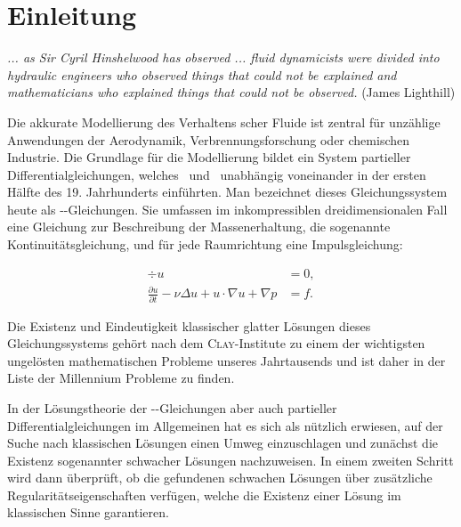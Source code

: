 \chapter*{Einleitung}

\begin{addmargin}[2em]{2em}%
  \textit{... as Sir Cyril Hinshelwood has observed ... fluid dynamicists
were divided into hydraulic engineers who observed things that
could not be explained and mathematicians who explained things
that could not be observed.} 
  \flushright(James Lighthill)
\end{addmargin}
\vspace{1.5cm}

Die akkurate Modellierung des Verhaltens \newton scher Fluide ist zentral für unzählige Anwendungen der Aerodynamik, Verbrennungsforschung oder chemischen Industrie.
Die Grundlage für die Modellierung bildet ein System partieller Differentialgleichungen, welches \navier\ und \stokes\ unabhängig voneinander in der ersten Hälfte des 19. Jahrhunderts einführten. 
Man bezeichnet dieses Gleichungssystem heute als \navier\hyp\stokes\hyp{}Gleichungen.
Sie umfassen im inkompressiblen dreidimensionalen Fall eine Gleichung zur Beschreibung der Massenerhaltung, die sogenannte Kontinuitätsgleichung, und für jede Raumrichtung eine Impulsgleichung:

\begin{align*}
  \div u &= 0, \\
  \frac{\partial u}{\partial t} - \nu \Delta u + u \cdot \nabla u + \nabla p &= f.
\end{align*}

Die Existenz und Eindeutigkeit klassischer glatter Lösungen dieses Gleichungssystems gehört nach dem \textsc{Clay}\hyp{}Institute zu einem der wichtigsten ungelösten mathematischen Probleme unseres Jahrtausends und ist daher in der Liste der Millennium Probleme zu finden.

In der Lösungstheorie der \navier\hyp\stokes\hyp{}Gleichungen aber auch partieller Differentialgleichungen im Allgemeinen hat es sich als nützlich erwiesen, auf der Suche nach klassischen Lösungen einen Umweg einzuschlagen und zunächst die Existenz sogenannter schwacher Lösungen nachzuweisen.
In einem zweiten Schritt wird dann überprüft, ob die gefundenen schwachen Lösungen über zusätzliche Regularitätseigenschaften verfügen, welche die Existenz einer Lösung im klassischen Sinne garantieren.

